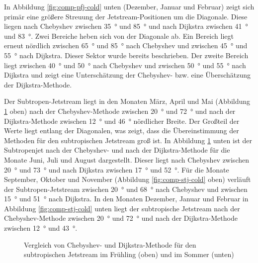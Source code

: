 In Abbildung \ref{fig:comp-pfj-cold} unten (Dezember, Januar und Februar) zeigt sich primär eine größere Streuung der Jetstream-Positionen um die Diagonale. Diese liegen nach Chebyshev zwischen \SI{35}{\degree} und \SI{85}{\degree} und nach Dijkstra zwischen \SI{41}{\degree} und \SI{83}{\degree}. Zwei Bereiche heben sich von der Diagonale ab. Ein Bereich liegt erneut nördlich zwischen \SI{65}{\degree} und \SI{85}{\degree} nach Chebyshev und zwischen \SI{45}{\degree} und \SI{55}{\degree} nach Dijkstra. Dieser Sektor wurde bereits beschrieben. Der zweite Bereich liegt zwischen \SI{40}{\degree} und \SI{50}{\degree} nach Chebyshev und zwischen \SI{50}{\degree} und \SI{55}{\degree} nach Dijkstra und zeigt eine Unterschätzung der Chebyshev- bzw. eine Überschätzung der Dijkstra-Methode. %

Der Subtropen-Jetstream liegt in den Monaten März, April und Mai (Abbildung \ref{fig:comp-stj-warm} oben) nach der Chebyshev-Methode zwischen \SI{20}{\degree} und \SI{72}{\degree} und nach der Dijkstra-Methode zwischen \SI{12}{\degree} und \SI{46}{\degree} nördlicher Breite. Der Großteil der Werte liegt entlang der Diagonalen, was zeigt, dass die Übereinstimmung der Methoden für den subtropischen Jetstream groß ist. In Abbildung \ref{fig:comp-stj-warm} unten ist der Subtropenjet nach der Chebyshev- und nach der Dijkstra-Methode für die Monate Juni, Juli und August dargestellt. Dieser liegt nach Chebyshev zwischen \SI{20}{\degree} und \SI{73}{\degree} und nach Dijkstra zwischen \SI{17}{\degree} und \SI{52}{\degree}. Für die Monate September, Oktober und November (Abbildung \ref{fig:comp-stj-cold} oben) verläuft der Subtropen-Jetstream zwischen \SI{20}{\degree} und \SI{68}{\degree} nach Chebyshev und zwischen \SI{15}{\degree} und \SI{51}{\degree} nach Dijkstra. In den Monaten Dezember, Januar und Februar in Abbildung \ref{fig:comp-stj-cold} unten liegt der subtropische Jetstream nach der Chebyshev-Methode zwischen \SI{20}{\degree} und \SI{72}{\degree} und nach der Dijkstra-Methode zwischen \SI{12}{\degree} und \SI{43}{\degree}.


\begin{figure}[hbt] 
  \centering
  \begin{minipage}{\textwidth}
  \centering
  \end{minipage}
  \begin{minipage}{\textwidth}
  \centering
  \end{minipage}
  \caption[Vergleich des Subtropenjets nach beiden Methoden für Frühling und Sommer]{Vergleich von Chebyshev- und Dijkstra-Methode für den subtropischen Jetstream im Frühling (oben) und im Sommer (unten)} \label{fig:comp-stj-warm}
\end{figure}



